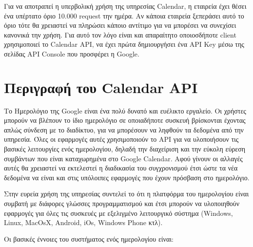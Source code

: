 Για να αποτραπεί η υπερβολική χρήση της υπηρεσίας Calendar, η εταιρεία έχει θέσει ένα υπέρτατο όριο 10.000 request την ημέρα. Αν κάποια εταιρεία ξεπεράσει αυτό το όριο τότε θα χρειαστεί να πληρώσει κάποιο αντίτιμο για να μπορέσει να συνεχίσει κανονικά την χρήση. Για αυτό τον λόγο είναι και απαραίτητο οποιοσδήποτε client χρησιμοποιεί το Calendar API, να έχει πρώτα δημιουργήσει ένα API Key μέσω της σελίδας API Console που προσφέρει η Google.

\section {Περιγραφή του Calendar API}
Το Ημερολόγιο της Google είναι ένα πολύ δυνατό και ευέλικτο εργαλείο. Οι χρήστες μπορούν να βλέπουν το ίδιο ημερολόγιο σε οποιαδήποτε συσκευή βρίσκονται έχοντας απλώς σύνδεση με το διαδίκτυο, για να μπορέσουν να ληφθούν τα δεδομένα από την υπηρεσία. Όλες οι εφαρμογές αυτές χρησιμοποιούν το API για να υλοποιήσουν τις βασικές λειτουργίες ενός ημερολογίου, δηλαδή την διαχείριση και την εύκολη εύρεση συμβάντων που είναι καταχωρημένα στο Google Calendar. Αφού γίνουν οι αλλαγές αυτές θα χρειαστεί να εκτελεστεί η διαδικασία του συγχρονισμού έτσι ώστε τα νέα δεδομένα να είναι και στις υπόλοιπες εφαρμογές που έχουν πρόσβαση στο ημερολόγιο. 

Στην ευρεία χρήση της υπηρεσίας συντελεί το ότι η πλατφόρμα του ημερολογίου είναι συμβατή με διάφορες γλώσσες προγραμματισμού και έτσι μπορούν να υλοποιηθούν εφαρμογές για όλες τις συσκευές με εξελιγμένο λειτουργικό σύστημα (Windows, Linux, MacOsX, Android, iOs, Windows Phone κτλ).

Οι βασικές έννοιες του συστήματος ενός ημερολογίου είναι:

